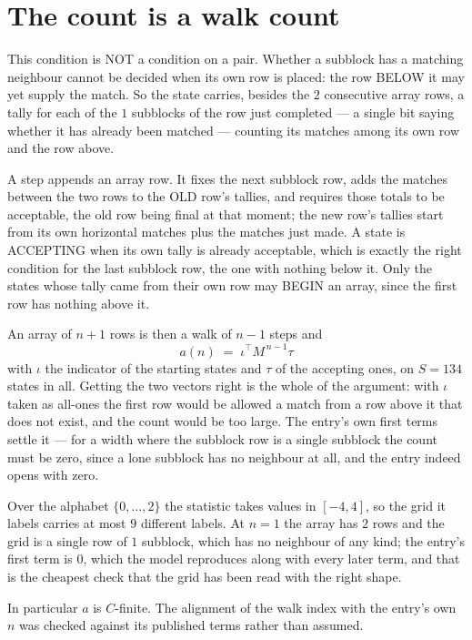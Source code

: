 \documentclass[11pt,a4paper]{article}
\theoremstyle{plain}
\theoremstyle{definition}
\begin{document}
\section{The count is a walk count}

This condition is NOT a condition on a pair. Whether a subblock has a
matching neighbour cannot be decided when its own row is placed: the row BELOW it may yet
supply the match. So the state carries, besides the $2$ consecutive array rows, a tally for
each of the $1$ subblocks of the row just completed --- a single bit saying whether it has already been matched --- counting its matches
among its own row and the row above.

A step appends an array row. It fixes the next subblock row, adds the matches between the two
rows to the OLD row's tallies, and requires those totals to be acceptable, the old row being
final at that moment; the new row's tallies start from its own horizontal matches plus the
matches just made. A state is ACCEPTING when its own tally is already acceptable, which is
exactly the right condition for the last subblock row, the one with nothing below it. Only the
states whose tally came from their own row may BEGIN an array, since the first row has nothing
above it.

An array of $n+1$ rows is then a walk of $n-1$ steps and
\[
a(n)\;=\;\iota^{\!\top}M^{\,n-1}\tau
\]
with $\iota$ the indicator of the starting states and $\tau$ of the accepting ones, on
$S=134$ states in all. Getting the two vectors right is the whole of the argument: with
$\iota$ taken as all-ones the first row would be allowed a match from a row above it that does
not exist, and the count would be too large. The entry's own first terms settle it --- for
a width where the subblock row is a single subblock
the count must be zero, since a lone subblock has no neighbour at all, and the entry indeed opens with zero.

Over the alphabet $\{0,\dots,2\}$ the statistic takes values in $[-4,4]$, so the
grid it labels carries at most $9$ different labels. At $n=1$ the array has $2$
rows and the grid is a single row of $1$
subblock, which has no neighbour of any kind; the entry's first term is
$0$, which the model reproduces along with every later term, and that is the cheapest
check that the grid has been read with the right shape.

In particular $a$ is $C$-finite. The alignment of the walk index with the entry's own $n$ was
checked against its published terms rather than assumed.
\end{document}
